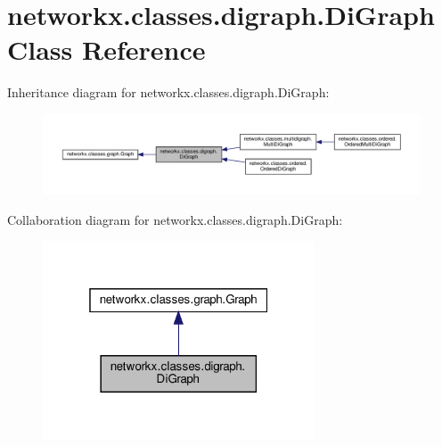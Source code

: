 \hypertarget{classnetworkx_1_1classes_1_1digraph_1_1DiGraph}{}\section{networkx.\+classes.\+digraph.\+Di\+Graph Class Reference}
\label{classnetworkx_1_1classes_1_1digraph_1_1DiGraph}


Inheritance diagram for networkx.\+classes.\+digraph.\+Di\+Graph\+:
\nopagebreak
\begin{figure}[H]
\begin{center}
\leavevmode
\includegraphics[width=350pt]{classnetworkx_1_1classes_1_1digraph_1_1DiGraph__inherit__graph}
\end{center}
\end{figure}


Collaboration diagram for networkx.\+classes.\+digraph.\+Di\+Graph\+:
\nopagebreak
\begin{figure}[H]
\begin{center}
\leavevmode
\includegraphics[width=229pt]{classnetworkx_1_1classes_1_1digraph_1_1DiGraph__coll__graph}
\end{center}
\end{figure}

